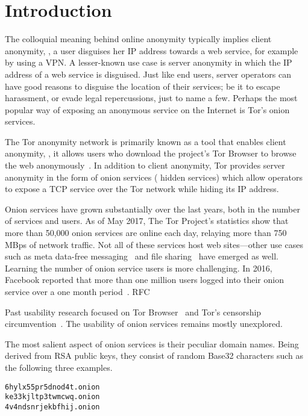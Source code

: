 \section{Introduction}
\label{sec:introduction}

The colloquial meaning behind online anonymity typically implies client
anonymity, \ie, a user disguises her IP address towards a web service, for
example by using a VPN.  A lesser-known use case is server anonymity in which
the IP address of a web service is disguised.  Just like end users, server
operators can have good reasons to disguise the location of their services; be
it to escape harassment, or evade legal repercussions, just to name a few.
Perhaps the most popular way of exposing an anonymous service on the Internet is
Tor's onion services.

The Tor anonymity network is primarily known as a tool that enables client
anonymity, \ie, it allows users who download the project's Tor Browser to
browse the web anonymously~\cite{Dingledine2004a}.  In addition to client
anonymity, Tor provides server anonymity in the form of onion services (\aka
hidden services) which allow operators to expose a TCP service over the Tor
network while hiding its IP address.

Onion services have grown substantially over the last years, both in the number
of services and users.  As of May 2017, The Tor Project's statistics show that
more than 50,000 onion services are online each day, relaying more than 750 MBps
of network traffic.  Not all of these services host web sites---other use cases
such as meta data-free messaging~\cite{ricochet} and file
sharing~\cite{onionshare} have emerged as well.  Learning the number of onion
service users is more challenging.  In 2016, Facebook reported that more than
one million users logged into their onion service over a one month
period~\cite{facebook-users}.
RFC~\cite{rfc7686}

Past usability research focused on Tor Browser~\cite{Clark2007a,Norcie2014a}
and Tor's censorship circumvention~\cite{Fifield2015a}.  The usability of onion
services remains mostly unexplored.

The most salient aspect of onion services is their peculiar domain names.
Being derived from RSA public keys, they consist of random Base32 characters
such as the following three examples.

{\footnotesize
\begin{verbatim}
6hylx55pr5dnod4t.onion
ke33kjltp3twmcwq.onion
4v4ndsnrjekbfhij.onion
\end{verbatim}
}

